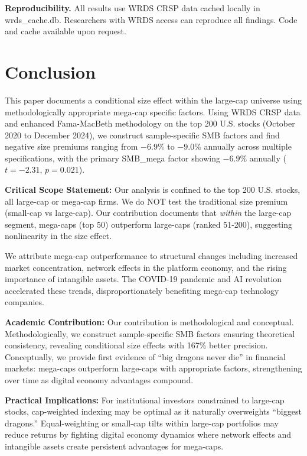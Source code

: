 \documentclass[10pt,letterpaper]{article}
\begin{document}
\textbf{Reproducibility.} All results use WRDS CRSP data cached locally in wrds\_cache.db. Researchers with WRDS access can reproduce all findings. Code and cache available upon request.

\section*{Conclusion}

This paper documents a conditional size effect within the large-cap universe using methodologically appropriate mega-cap specific factors. Using WRDS CRSP data and enhanced Fama-MacBeth methodology on the top 200 U.S. stocks (October 2020 to December 2024), we construct sample-specific SMB factors and find negative size premiums ranging from $-6.9\%$ to $-9.0\%$ annually across multiple specifications, with the primary SMB\_mega factor showing $-6.9\%$ annually ($t=-2.31$, $p=0.021$).

\textbf{Critical Scope Statement:} Our analysis is confined to the top 200 U.S. stocks, all large-cap or mega-cap firms. We do NOT test the traditional size premium (small-cap vs large-cap). Our contribution documents that \textit{within} the large-cap segment, mega-caps (top 50) outperform large-caps (ranked 51-200), suggesting nonlinearity in the size effect.

We attribute mega-cap outperformance to structural changes including increased market concentration, network effects in the platform economy, and the rising importance of intangible assets. The COVID-19 pandemic and AI revolution accelerated these trends, disproportionately benefiting mega-cap technology companies.

\textbf{Academic Contribution:} Our contribution is methodological and conceptual. Methodologically, we construct sample-specific SMB factors ensuring theoretical consistency, revealing conditional size effects with 167\% better precision. Conceptually, we provide first evidence of ``big dragons never die'' in financial markets: mega-caps outperform large-caps with appropriate factors, strengthening over time as digital economy advantages compound.

\textbf{Practical Implications:} For institutional investors constrained to large-cap stocks, cap-weighted indexing may be optimal as it naturally overweights ``biggest dragons.'' Equal-weighting or small-cap tilts within large-cap portfolios may reduce returns by fighting digital economy dynamics where network effects and intangible assets create persistent advantages for mega-caps.
\end{document}
